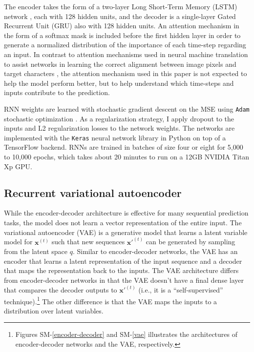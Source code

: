 \documentclass[hidelinks,12pt]{article}
\begin{document}
The encoder takes the form of a two-layer Long Short-Term Memory (LSTM) network \citep{schmidhuber1997long}, each with 128 hidden units, and the decoder is a single-layer Gated Recurrent Unit (GRU) \citep{chung2014} also with 128 hidden units. An attention mechanism in the form of a softmax mask is included before the first hidden layer in order to generate a normalized distribution of the importance of each time-step regarding an input. In contrast to attention mechanisms used in neural machine translation to assist networks in learning the correct alignment between image pixels and target characters \citep{cho2014learning,2017arXiv171204046P}, the attention mechanism used in this paper is not expected to help the model perform better, but to help understand which time-steps and inputs contribute to the prediction.

RNN weights are learned with stochastic gradient descent on the MSE using \texttt{Adam} stochastic optimization \citep{kingma2014adam}. As a regularization strategy, I apply dropout to the inputs and L2 regularization losses to the network weights. The networks are implemented with the \texttt{Keras} neural network library \citep{chollet2015keras} in Python on top of a TensorFlow backend. RNNs are trained in batches of size four or eight for 5,000 to 10,000 epochs, which takes about 20 minutes to run on a 12GB NVIDIA Titan Xp GPU.


\subsection{Recurrent variational autoencoder}

While the encoder-decoder architecture is effective for many sequential prediction tasks, the model does not learn a vector representation of the entire input. The variational autoencoder (VAE) \citep{kingma2013auto} is a generative model that learns a latent variable model for $\boldsymbol{x}^{(t)}$ such that new sequences $\boldsymbol{x'}^{(t)}$ can be generated by sampling from the latent space $q$. Similar to encoder-decoder networks, the VAE has an encoder that learns a latent representation of the input sequence and a decoder that maps the representation back to the inputs. The VAE architecture differs from encoder-decoder networks in that the VAE doesn't have a final dense layer that compares the decoder outputs to  $\boldsymbol{x'}^{(t)}$ (i.e., it is a ``self-supervised'' technique).\footnote{Figures SM-\ref{encoder-decoder} and SM-\ref{vae} illustrates the architectures of encoder-decoder networks and the VAE, respectively.} The other difference is that the VAE maps the inputs to a distribution over latent variables. 
\end{document}
